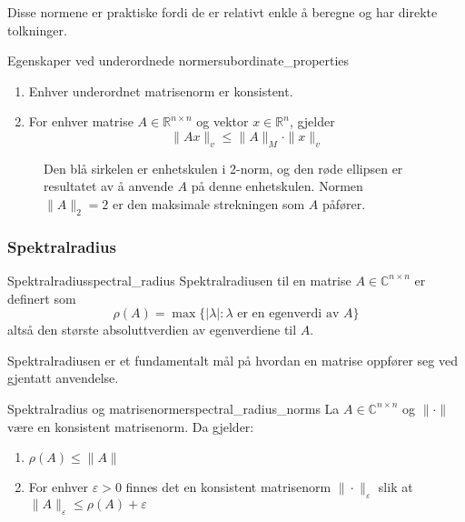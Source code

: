 \documentclass[../main.tex]{subfiles}
\begin{document}
Disse normene er praktiske fordi de er relativt enkle å beregne og har direkte tolkninger.

\begin{theorem}{Egenskaper ved underordnede normer}{subordinate_properties}
	\begin{enumerate}
		\item Enhver underordnet matrisenorm er konsistent.
		\item For enhver matrise $A \in \mathbb{R}^{n \times n}$ og vektor $x \in \mathbb{R}^n$, gjelder
		      \[
			      \|Ax\|_v \leq \|A\|_M \cdot \|x\|_v
		      \]
	\end{enumerate}
\end{theorem}

\begin{figure}
	\centering
	
	\caption{Den blå sirkelen er enhetskulen i 2-norm, og den røde ellipsen er resultatet av å anvende $A$ på denne enhetskulen. Normen $\|A\|_2 = 2$ er den maksimale strekningen som $A$ påfører.}
	\label{fig:matrix_norm}
\end{figure}

\subsubsection{Spektralradius}

\begin{definition}{Spektralradius}{spectral_radius}
	Spektralradiusen til en matrise $A \in \mathbb{C}^{n \times n}$ er definert som
	\[
		\rho(A) = \max\{|\lambda| : \lambda \text{ er en egenverdi av } A\}
	\]
	altså den største absoluttverdien av egenverdiene til $A$.
\end{definition}

Spektralradiusen er et fundamentalt mål på hvordan en matrise oppfører seg ved gjentatt anvendelse.

\begin{theorem}{Spektralradius og matrisenormer}{spectral_radius_norms}
	La $A \in \mathbb{C}^{n \times n}$ og $\|\cdot\|$ være en konsistent matrisenorm. Da gjelder:
	\begin{enumerate}
		\item $\rho(A) \leq \|A\|$
		\item For enhver $\varepsilon > 0$ finnes det en konsistent matrisenorm $\|\cdot\|_\varepsilon$ slik at $\|A\|_\varepsilon \leq \rho(A) + \varepsilon$
	\end{enumerate}
\end{theorem}
\end{document}
